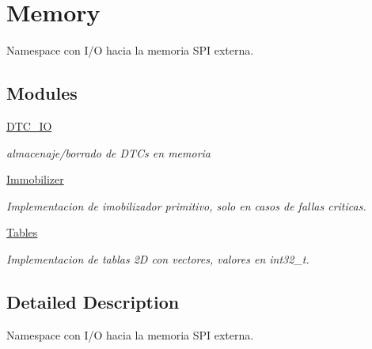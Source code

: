 \hypertarget{group__Memory}{}\section{Memory}
\label{group__Memory}


Namespace con I/O hacia la memoria S\+PI externa.  


\subsection*{Modules}
\begin{DoxyCompactItemize}
\item 
\hyperlink{group__DTC__IO}{D\+T\+C\+\_\+\+IO}
\begin{DoxyCompactList}\small\item\em almacenaje/borrado de D\+TC\textquotesingle{}s en memoria \end{DoxyCompactList}\item 
\hyperlink{group__Immobilizer}{Immobilizer}
\begin{DoxyCompactList}\small\item\em Implementacion de imobilizador primitivo, solo en casos de fallas criticas. \end{DoxyCompactList}\item 
\hyperlink{group__Tables}{Tables}
\begin{DoxyCompactList}\small\item\em Implementacion de tablas 2D con vectores, valores en int32\+\_\+t. \end{DoxyCompactList}\end{DoxyCompactItemize}


\subsection{Detailed Description}
Namespace con I/O hacia la memoria S\+PI externa. 

